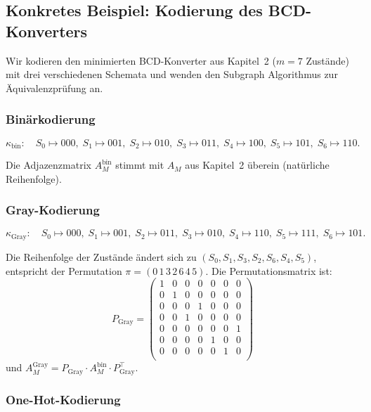 ﻿\documentclass[a4paper,12pt]{article}
\theoremstyle{definition}
\begin{document}
\subsection{Konkretes Beispiel: Kodierung des BCD-Konverters}

Wir kodieren den minimierten BCD-Konverter aus Kapitel~2 ($m = 7$ Zustände)
mit drei verschiedenen Schemata und wenden den Subgraph Algorithmus zur
Äquivalenzprüfung an.

\subsubsection{Binärkodierung}

\[
  \kappa_{\text{bin}}:
  \quad S_0 \mapsto 000,\; S_1 \mapsto 001,\; S_2 \mapsto 010,\;
  S_3 \mapsto 011,\; S_4 \mapsto 100,\; S_5 \mapsto 101,\; S_6 \mapsto 110.
\]

Die Adjazenzmatrix $A_M^{\text{bin}}$ stimmt mit $A_M$ aus Kapitel~2 überein (natürliche
Reihenfolge).

\subsubsection{Gray-Kodierung}

\[
  \kappa_{\text{Gray}}:
  \quad S_0 \mapsto 000,\; S_1 \mapsto 001,\; S_2 \mapsto 011,\;
  S_3 \mapsto 010,\; S_4 \mapsto 110,\; S_5 \mapsto 111,\; S_6 \mapsto 101.
\]

Die Reihenfolge der Zustände ändert sich zu $(S_0, S_1, S_3, S_2, S_6, S_4, S_5)$,
entspricht der Permutation $\pi = (0\,1\,3\,2\,6\,4\,5)$. Die Permutationsmatrix ist:
\[
  P_{\text{Gray}} = \begin{pmatrix}
    1 & 0 & 0 & 0 & 0 & 0 & 0 \\
    0 & 1 & 0 & 0 & 0 & 0 & 0 \\
    0 & 0 & 0 & 1 & 0 & 0 & 0 \\
    0 & 0 & 1 & 0 & 0 & 0 & 0 \\
    0 & 0 & 0 & 0 & 0 & 0 & 1 \\
    0 & 0 & 0 & 0 & 1 & 0 & 0 \\
    0 & 0 & 0 & 0 & 0 & 1 & 0 \\
  \end{pmatrix}
\]
und $A_M^{\text{Gray}} = P_{\text{Gray}} \cdot A_M^{\text{bin}} \cdot P_{\text{Gray}}^\top$.

\subsubsection{One-Hot-Kodierung}
\end{document}
